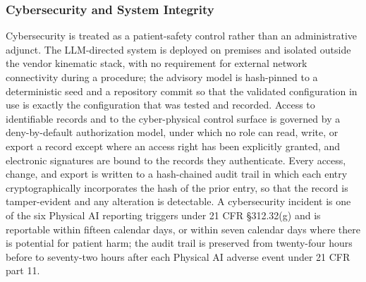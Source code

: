 \subsubsection{Cybersecurity and System Integrity}

Cybersecurity is treated as a patient-safety control rather than an administrative
adjunct. The LLM-directed system is deployed on premises and isolated outside the
vendor kinematic stack, with no requirement for external network connectivity during
a procedure; the advisory model is hash-pinned to a deterministic seed and a
repository commit so that the validated configuration in use is exactly the
configuration that was tested and recorded. Access to identifiable records and to
the cyber-physical control surface is governed by a deny-by-default authorization
model, under which no role can read, write, or export a record except where an
access right has been explicitly granted, and electronic signatures are bound to the
records they authenticate. Every access, change, and export is written to a
hash-chained audit trail in which each entry cryptographically incorporates the hash
of the prior entry, so that the record is tamper-evident and any alteration is
detectable. A cybersecurity incident is one of the six Physical AI reporting
triggers under 21 CFR \S 312.32(g) and is reportable within fifteen calendar days,
or within seven calendar days where there is potential for patient harm; the audit
trail is preserved from twenty-four hours before to seventy-two hours after each
Physical AI adverse event under 21 CFR part 11.

